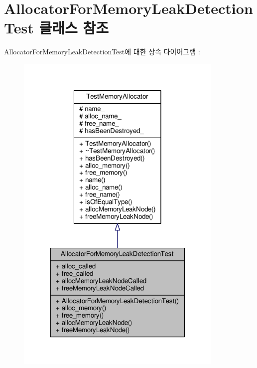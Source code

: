 \hypertarget{class_allocator_for_memory_leak_detection_test}{}\section{Allocator\+For\+Memory\+Leak\+Detection\+Test 클래스 참조}
\label{class_allocator_for_memory_leak_detection_test}


Allocator\+For\+Memory\+Leak\+Detection\+Test에 대한 상속 다이어그램 \+: 
\nopagebreak
\begin{figure}[H]
\begin{center}
\leavevmode
\includegraphics[width=282pt]{class_allocator_for_memory_leak_detection_test__inherit__graph}
\end{center}
\end{figure}


